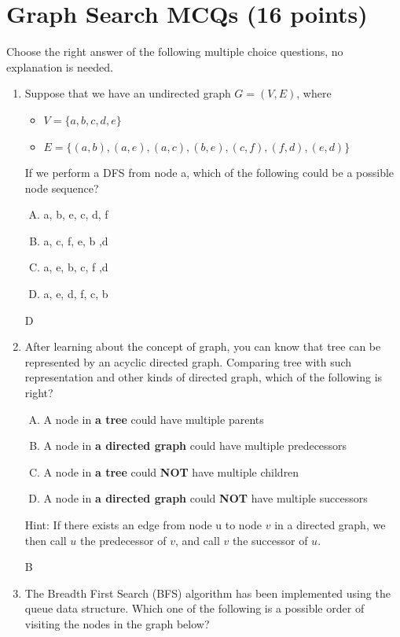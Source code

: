 \documentclass[11pt]{exam}
\begin{document}
\section{Graph Search MCQs (16 points)}
Choose the right answer of the following multiple choice questions, no explanation is needed. 
\begin{enumerate}
    \item Suppose that we have an undirected graph $G=(V,E)$, where
    \begin{itemize}
        \item $V=\{a,b,c,d,e\}$
        \item $E = \{(a, b), (a, e), (a, c), (b, e), (c, f), (f, d), (e, d)\}$
    \end{itemize}
    If we perform a DFS from node a, which of the following could be a possible node sequence?
    \begin{enumerate}[A.]
        \item a, b, e, c, d, f
        \item a, c, f, e, b ,d
        \item a, e, b, c, f ,d
        \item a, e, d, f, c, b
    \end{enumerate}
    \begin{solution}
    D
    \end{solution}
    \item After learning about the concept of graph, you can know that tree can be represented by an acyclic directed graph. Comparing tree with such representation and other kinds of directed graph, which of the following is right?
    \begin{enumerate}[A.]
        \item A node in \textbf{a tree} could have multiple parents
        \item A node in \textbf{a directed graph} could have multiple predecessors
        \item A node in \textbf{a tree} could \textbf{NOT} have multiple children
        \item A node in \textbf{a directed graph} could \textbf{NOT} have multiple successors
    \end{enumerate}
    Hint: If there exists an edge from node u to node $v$ in a directed graph, we then call $u$ the predecessor of $v$, and call $v$ the successor of $u$.
    \begin{solution}
    B
    \end{solution}
    \item The Breadth First Search (BFS) algorithm has been implemented using the queue data structure. Which one of the following is a possible order of visiting the nodes in the graph below?

\end{enumerate}
\end{document}
